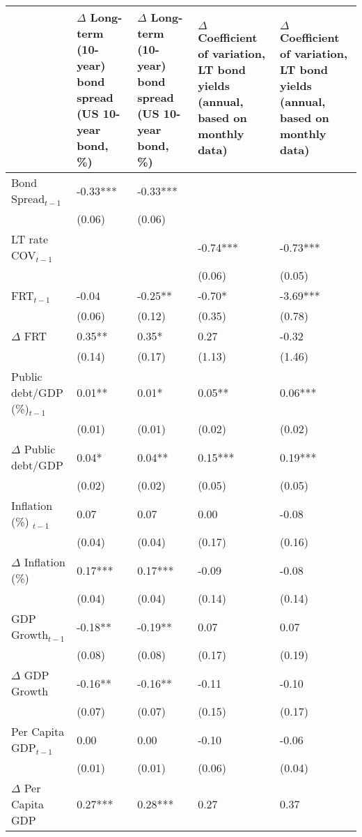 \begingroup\tiny
\begin{tabular}{lp{3cm}p{3cm}p{3cm}p{3cm}}
  \hline
 & $\Delta$ Long-term (10-year) bond spread (US 10-year bond, \%) & $\Delta$ Long-term (10-year) bond spread (US 10-year bond, \%) & $\Delta$ Coefficient of variation, LT bond yields (annual, based on monthly data) & $\Delta$ Coefficient of variation, LT bond yields (annual, based on monthly data) \\ 
  \hline
Bond Spread$_{t-1}$ & -0.33*** & -0.33*** &  &  \\ 
   & (0.06) & (0.06) &  &  \\ 
  LT rate COV$_{t-1}$ &  &  & -0.74*** & -0.73*** \\ 
   &  &  & (0.06) & (0.05) \\ 
  FRT$_{t-1}$ & -0.04 & -0.25** & -0.70* & -3.69*** \\ 
   & (0.06) & (0.12) & (0.35) & (0.78) \\ 
  $\Delta$ FRT & 0.35** & 0.35* & 0.27 & -0.32 \\ 
   & (0.14) & (0.17) & (1.13) & (1.46) \\ 
  Public debt/GDP (\%)$_{t-1}$ & 0.01** & 0.01* & 0.05** & 0.06*** \\ 
   & (0.01) & (0.01) & (0.02) & (0.02) \\ 
  $\Delta$ Public debt/GDP & 0.04* & 0.04** & 0.15*** & 0.19*** \\ 
   & (0.02) & (0.02) & (0.05) & (0.05) \\ 
  Inflation (\%) $_{t-1}$ & 0.07 & 0.07 & 0.00 & -0.08 \\ 
   & (0.04) & (0.04) & (0.17) & (0.16) \\ 
  $\Delta$ Inflation (\%) & 0.17*** & 0.17*** & -0.09 & -0.08 \\ 
   & (0.04) & (0.04) & (0.14) & (0.14) \\ 
  GDP Growth$_{t-1}$ & -0.18** & -0.19** & 0.07 & 0.07 \\ 
   & (0.08) & (0.08) & (0.17) & (0.19) \\ 
  $\Delta$ GDP Growth & -0.16** & -0.16** & -0.11 & -0.10 \\ 
   & (0.07) & (0.07) & (0.15) & (0.17) \\ 
  Per Capita GDP$_{t-1}$ & 0.00 & 0.00 & -0.10 & -0.06 \\ 
   & (0.01) & (0.01) & (0.06) & (0.04) \\ 
  $\Delta$ Per Capita GDP & 0.27*** & 0.28*** & 0.27 & 0.37 \\ 

\end{tabular}
